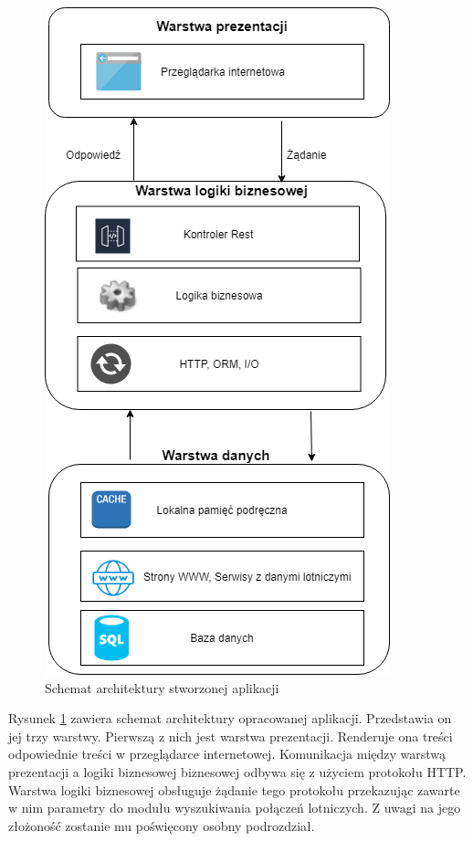 \documentclass[12pt, twoside]{report}
\begin{document}
\begin{figure}[!ht]
\centering
\includegraphics[scale=0.60, keepaspectratio]{architecure_diagram.png}
\caption{Schemat architektury stworzonej aplikacji}
\label{fig:architecure_diagram}
\end{figure}

\noindent Rysunek \ref{fig:architecure_diagram} zawiera schemat architektury opracowanej aplikacji. Przedstawia on jej trzy warstwy. Pierwszą z nich jest warstwa prezentacji. Renderuje ona treści odpowiednie treści w przeglądarce internetowej. Komunikacja między warstwą prezentacji a logiki biznesowej biznesowej odbywa się z użyciem protokołu HTTP. Warstwa logiki biznesowej obsługuje żądanie tego protokołu przekazując zawarte w nim parametry do modułu wyszukiwania połączeń lotniczych. Z uwagi na jego złożoność zostanie mu poświęcony osobny podrozdział.
\end{document}
